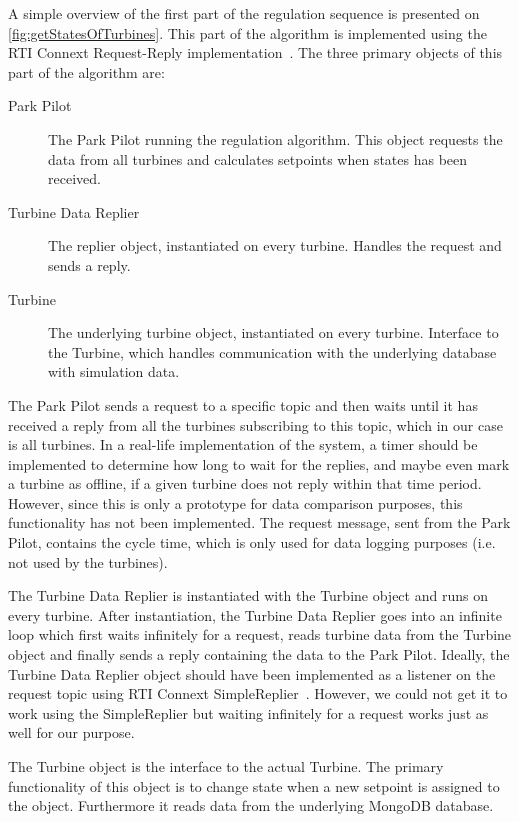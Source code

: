 A simple overview of the first part of the regulation sequence is presented on \cref{fig:getStatesOfTurbines}. This part of the algorithm is implemented using the RTI Connext Request-Reply implementation~\cite{rtiConnextUsersManual}. The three primary objects of this part of the algorithm are:

\begin{description}
	\item [Park Pilot] The Park Pilot running the regulation algorithm. This object requests the data from all turbines and calculates setpoints when states has been received.
	\item [Turbine Data Replier] The replier object, instantiated on every turbine. Handles the request and sends a reply.
	\item [Turbine] The underlying turbine object, instantiated on every turbine. Interface to the Turbine, which handles communication with the underlying database with simulation data.
\end{description}

The Park Pilot sends a request to a specific topic and then waits until it has received a reply from all the turbines subscribing to this topic, which in our case is all turbines. In a real-life implementation of the system, a timer should be implemented to determine how long to wait for the replies, and maybe even mark a turbine as offline, if a given turbine does not reply within that time period. However, since this is only a prototype for data comparison purposes, this functionality has not been implemented. The request message, sent from the Park Pilot, contains the cycle time, which is only used for data logging purposes (i.e. not used by the turbines).

The Turbine Data Replier is instantiated with the Turbine object and runs on every turbine. After instantiation, the Turbine Data Replier goes into an infinite loop which first waits infinitely for a request, reads turbine data from the Turbine object and finally sends a reply containing the data to the Park Pilot. Ideally, the Turbine Data Replier object should have been implemented as a listener on the request topic using RTI Connext SimpleReplier~\cite{rtiConnextUsersManual}. However, we could not get it to work using the SimpleReplier but waiting infinitely for a request works just as well for our purpose.

The Turbine object is the interface to the actual Turbine. The primary functionality of this object is to change state when a new setpoint is assigned to the object. Furthermore it reads data from the underlying MongoDB database. 

